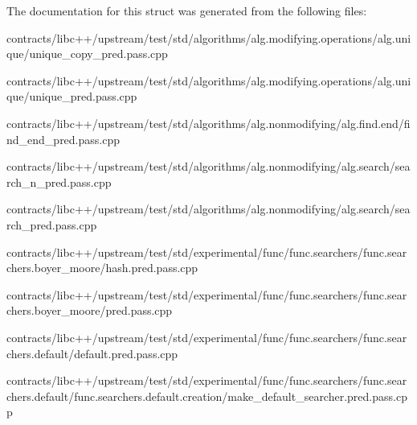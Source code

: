 The documentation for this struct was generated from the following files\+:\begin{DoxyCompactItemize}
\item 
contracts/libc++/upstream/test/std/algorithms/alg.\+modifying.\+operations/alg.\+unique/unique\+\_\+copy\+\_\+pred.\+pass.\+cpp\item 
contracts/libc++/upstream/test/std/algorithms/alg.\+modifying.\+operations/alg.\+unique/unique\+\_\+pred.\+pass.\+cpp\item 
contracts/libc++/upstream/test/std/algorithms/alg.\+nonmodifying/alg.\+find.\+end/find\+\_\+end\+\_\+pred.\+pass.\+cpp\item 
contracts/libc++/upstream/test/std/algorithms/alg.\+nonmodifying/alg.\+search/search\+\_\+n\+\_\+pred.\+pass.\+cpp\item 
contracts/libc++/upstream/test/std/algorithms/alg.\+nonmodifying/alg.\+search/search\+\_\+pred.\+pass.\+cpp\item 
contracts/libc++/upstream/test/std/experimental/func/func.\+searchers/func.\+searchers.\+boyer\+\_\+moore/hash.\+pred.\+pass.\+cpp\item 
contracts/libc++/upstream/test/std/experimental/func/func.\+searchers/func.\+searchers.\+boyer\+\_\+moore/pred.\+pass.\+cpp\item 
contracts/libc++/upstream/test/std/experimental/func/func.\+searchers/func.\+searchers.\+default/default.\+pred.\+pass.\+cpp\item 
contracts/libc++/upstream/test/std/experimental/func/func.\+searchers/func.\+searchers.\+default/func.\+searchers.\+default.\+creation/make\+\_\+default\+\_\+searcher.\+pred.\+pass.\+cpp\end{DoxyCompactItemize}
